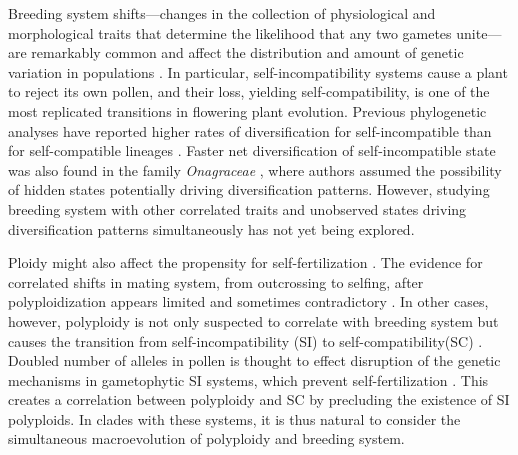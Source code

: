 Breeding system shifts---changes in the collection of physiological and morphological traits that determine the likelihood that any two gametes unite---are remarkably common and affect the distribution and amount of genetic variation in populations \citep{stebbins1974, barrett2013}.
In particular, self-incompatibility systems cause a plant to reject its own pollen, and their loss, yielding self-compatibility, is one of the most replicated transitions in flowering plant evolution. %
Previous phylogenetic analyses have reported higher rates of diversification for self-incompatible than for self-compatible lineages \citep{goldberg_2010, devos2014}. Faster net diversification of self-incompatible state was also found in the family  \textit{Onagraceae} \citep{freyman_2017} , where authors assumed the possibility of hidden states potentially driving diversification patterns. However, studying breeding system with other correlated traits and unobserved states driving diversification patterns simultaneously has not yet being explored. %

Ploidy might also affect the propensity for self-fertilization \citep{stebbins1950}. 
The evidence for correlated shifts in mating system, from outcrossing to selfing, after polyploidization appears limited and sometimes contradictory \citep{barringer2007, barrett2008, husband2008}.
In other cases, however, polyploidy is not only suspected to correlate with breeding system but causes the transition from self-incompatibility (SI) to self-compatibility(SC) \citep{stout1942, lewis1947}.
Doubled number of alleles in pollen is thought to effect disruption of the genetic mechanisms in gametophytic SI systems, which prevent self-fertilization \citep{entani1999, tsukamoto2005, kubo2010}. 
This creates a correlation between polyploidy and SC by precluding the existence of SI polyploids.
In clades with these systems, it is thus natural to consider the simultaneous macroevolution of polyploidy and breeding system.

